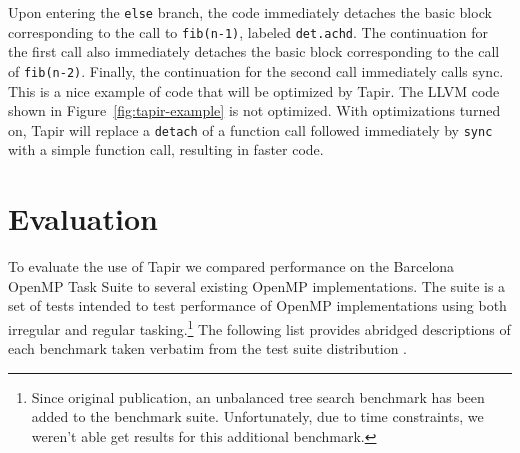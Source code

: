 \documentclass[sigconf]{acmart}
\newcommand{\figref}[1]         {Figure~\ref{fig:#1}}
\begin{document}
Upon entering the \texttt{else} branch, the code immediately detaches the basic
block corresponding to the call to \texttt{fib(n-1)}, labeled
\texttt{det.achd}. The continuation for the first call also immediately
detaches the basic block corresponding to the call of \texttt{fib(n-2)}.
Finally, the continuation for the second call immediately calls sync. This is
a nice example of code that will be optimized by Tapir. The LLVM code
shown in \figref{tapir-example} is not optimized. With optimizations turned
on, Tapir will replace a \texttt{detach} of a function call followed
immediately by \texttt{sync} with a simple function call, resulting in faster
code. 

\section{Evaluation} \label{Sec:Evaluation}

To evaluate the use of Tapir we compared performance on the Barcelona OpenMP Task 
Suite to several existing OpenMP implementations. The suite is a set of tests
intended to test performance of OpenMP implementations using both irregular and
regular tasking.\footnote{Since original publication, an unbalanced tree search
benchmark has been added to the benchmark suite. Unfortunately, due to time
constraints, we weren't able get results for this additional benchmark.} The
following list provides abridged descriptions of each benchmark taken verbatim
from the test suite distribution \cite{barcelona}.
\end{document}
